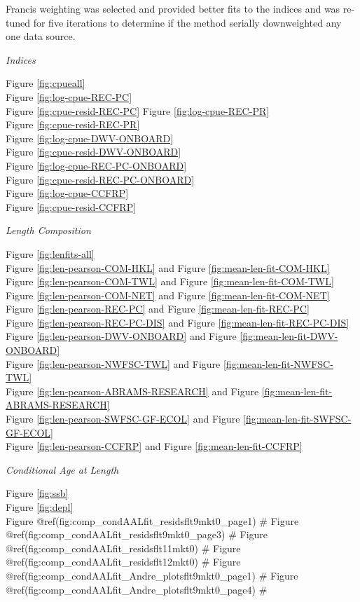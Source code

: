 \documentclass[
  english,
  a4paper,
]{article}
\begin{document}
Francis weighting was selected and provided better fits to the indices
and was re-tuned for five iterations to determine if the method serially downweighted any
one data source.

\emph{Indices}

Figure \ref{fig:cpueall}\\
Figure \ref{fig:log-cpue-REC-PC}\\
Figure \ref{fig:cpue-resid-REC-PC}
Figure \ref{fig:log-cpue-REC-PR}\\
Figure \ref{fig:cpue-resid-REC-PR}\\
Figure \ref{fig:log-cpue-DWV-ONBOARD}\\
Figure \ref{fig:cpue-resid-DWV-ONBOARD}\\
Figure \ref{fig:log-cpue-REC-PC-ONBOARD}\\
Figure \ref{fig:cpue-resid-REC-PC-ONBOARD}\\
Figure \ref{fig:log-cpue-CCFRP}\\
Figure \ref{fig:cpue-resid-CCFRP}

\emph{Length Composition}

Figure \ref{fig:lenfits-all}\\
Figure \ref{fig:len-pearson-COM-HKL} and Figure \ref{fig:mean-len-fit-COM-HKL}\\
Figure \ref{fig:len-pearson-COM-TWL} and Figure \ref{fig:mean-len-fit-COM-TWL}\\
Figure \ref{fig:len-pearson-COM-NET} and Figure \ref{fig:mean-len-fit-COM-NET}\\
Figure \ref{fig:len-pearson-REC-PC} and Figure \ref{fig:mean-len-fit-REC-PC}\\
Figure \ref{fig:len-pearson-REC-PC-DIS} and Figure \ref{fig:mean-len-fit-REC-PC-DIS}\\
Figure \ref{fig:len-pearson-DWV-ONBOARD} and Figure \ref{fig:mean-len-fit-DWV-ONBOARD}\\
Figure \ref{fig:len-pearson-NWFSC-TWL} and Figure \ref{fig:mean-len-fit-NWFSC-TWL}\\
Figure \ref{fig:len-pearson-ABRAMS-RESEARCH} and Figure \ref{fig:mean-len-fit-ABRAMS-RESEARCH}\\
Figure \ref{fig:len-pearson-SWFSC-GF-ECOL} and Figure \ref{fig:mean-len-fit-SWFSC-GF-ECOL}\\
Figure \ref{fig:len-pearson-CCFRP} and Figure \ref{fig:mean-len-fit-CCFRP}

\emph{Conditional Age at Length}

Figure \ref{fig:ssb}\\
Figure \ref{fig:depl}\\
Figure @ref(fig:comp\_condAALfit\_residsflt9mkt0\_page1) \#
Figure @ref(fig:comp\_condAALfit\_residsflt9mkt0\_page3) \#
Figure @ref(fig:comp\_condAALfit\_residsflt11mkt0) \#
Figure @ref(fig:comp\_condAALfit\_residsflt12mkt0) \#
Figure @ref(fig:comp\_condAALfit\_Andre\_plotsflt9mkt0\_page1) \#
Figure @ref(fig:comp\_condAALfit\_Andre\_plotsflt9mkt0\_page4) \#
\end{document}

